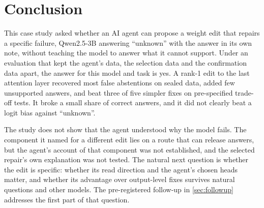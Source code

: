 \section{Conclusion}
\label{sec:conclusion}

This case study asked whether an AI agent can propose a weight edit that repairs a specific failure, Qwen2.5-3B
answering ``unknown'' with the answer in its own note, without teaching the model to answer what it cannot support.
Under an evaluation that kept the agent's data, the selection data and the confirmation data apart, the answer for
this model and task is yes. A rank-1 edit to the last attention layer recovered most false abstentions on sealed
data, added few unsupported answers, and beat three of five simpler fixes on pre-specified trade-off tests. It broke
a small share of correct answers, and it did not clearly beat a logit bias against ``unknown''.

The study does not show that the agent understood why the model fails. The component it named for a different edit
lies on a route that can release answers, but the agent's account of that component was not established, and the
selected repair's own explanation was not tested. The natural next question is whether the edit is specific: whether
its read direction and the agent's chosen heads matter, and whether its advantage over output-level fixes survives
natural questions and other models. The pre-registered follow-up in \cref{sec:followup} addresses the first part of
that question.
